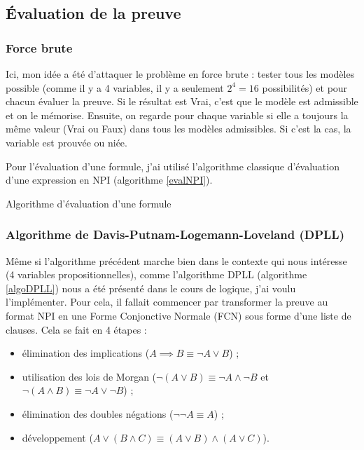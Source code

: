 \documentclass[12pt, a4paper]{article}
\begin{document}
\subsection{Évaluation de la preuve}

\subsubsection{Force brute}

Ici, mon idée a été d'attaquer le problème en force brute : tester tous les modèles possible (comme il y a 4 variables, il y a seulement $2^4=16$ possibilités) et pour chacun évaluer la preuve. Si le résultat est Vrai, c'est que le modèle est admissible et on le mémorise. Ensuite, on regarde pour chaque variable si elle a toujours la même valeur (Vrai ou Faux) dans tous les modèles admissibles. Si c'est la cas, la variable est prouvée ou niée.

Pour l'évaluation d'une formule, j'ai utilisé l'algorithme classique d'évaluation d'une expression en NPI (algorithme \ref{evalNPI}).

\begin{algorithm}[h]
\caption{Algorithme d'évaluation d'une formule}
\label{evalNPI}
\end{algorithm}

\subsubsection{Algorithme de Davis-Putnam-Logemann-Loveland (DPLL)}

Même si l'algorithme précédent marche bien dans le contexte qui nous intéresse (4 variables propositionnelles), comme l'algorithme DPLL (algorithme \ref{algoDPLL}) nous a été présenté dans le cours de logique, j'ai voulu l'implémenter. Pour cela, il fallait commencer par transformer la preuve au format NPI en une Forme Conjonctive Normale (FCN) sous forme d'une liste de clauses. Cela se fait en 4 étapes :
\begin{itemize}
\item élimination des implications ($A \implies B \equiv \neg A \vee B$) ;
\item utilisation des lois de Morgan ($\neg (A \vee B) \equiv \neg A \wedge \neg B$ et $\neg (A \wedge B) \equiv \neg A \vee \neg B$) ;
\item élimination des doubles négations ($\neg \neg A \equiv A$) ;
\item développement ($A \vee (B \wedge C) \equiv (A \vee B) \wedge (A \vee C)$).
\end{itemize}
\end{document}
